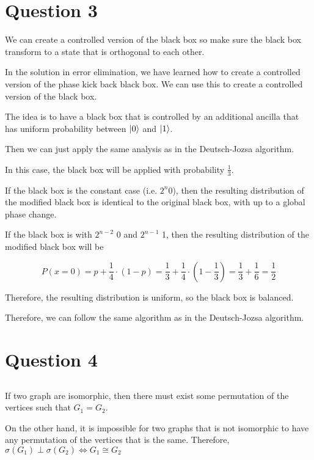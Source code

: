 \documentclass{article}
\theoremstyle{definition}
\DeclarePairedDelimiter\ket{\lvert}{\rangle}
\begin{document}
\pagebreak
\section{Question 3}

We can create a controlled version of the black box so make sure the black box transform
to a state that is orthogonal to each other.

In the solution in error elimination, we have learned how to create a
controlled version of the phase kick back black box. We can use this
to create a controlled version of the black box.

The idea is to have a black box that is controlled by an additional ancilla that has
uniform probability between $\ket{0}$ and $\ket{1}$.

Then we can just apply the same analysis as in the Deutsch-Jozsa algorithm.

In this case, the black box will be applied with probability $\frac{1}{3}$.

If the black box is the constant case (i.e. $2^n$0), then the resulting distribution of the modified black box is
identical to the original black box, with up to a global phase change.

If the black box is with $2^{n-2}$ 0 and $2^{n-1}$ 1, then the resulting distribution
of the modified black box will be

\[
  P(x=0) = p + \frac{1}{4} \cdot (1-p) = \frac{1}{3} + \frac{1}{4} \cdot (1-\frac{1}{3}) = \frac{1}{3} + \frac{1}{6} =\frac{1}{2}
\]

Therefore, the resulting distribution is uniform, so the black box is balanced.

Therefore, we can follow the same algorithm as in the Deutsch-Jozsa algorithm.

\pagebreak



\section{Question 4 }

\subsection{}

If two graph are isomorphic, then there must exist some permutation of the vertices
such that \(G_1=G_2\).

On the other hand, it is impossible for two graphs that is not isomorphic to have
any permutation of the vertices that is the same. Therefore, \(\sigma(G_1)\perp \sigma(G_2) \iff G_1 \cong G_2\)
\end{document}
